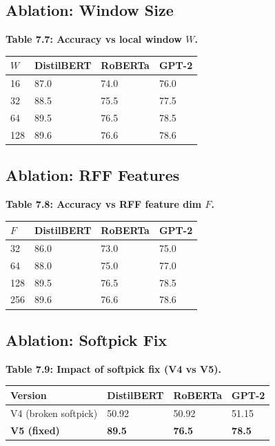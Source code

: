 \subsection{Ablation: Window Size}

\textbf{Table 7.7: Accuracy vs local window $W$.}

\begin{table}[H]
\centering
\small
\begin{tabular}{llll}
\toprule
\textbf{$W$} & \textbf{DistilBERT} & \textbf{RoBERTa} & \textbf{GPT-2} \\
\midrule
16 & 87.0 & 74.0 & 76.0 \\
32 & 88.5 & 75.5 & 77.5 \\
64 & 89.5 & 76.5 & 78.5 \\
128 & 89.6 & 76.6 & 78.6 \\
\bottomrule
\end{tabular}
\end{table}

\subsection{Ablation: RFF Features}

\textbf{Table 7.8: Accuracy vs RFF feature dim $F$.}

\begin{table}[H]
\centering
\small
\begin{tabular}{llll}
\toprule
\textbf{$F$} & \textbf{DistilBERT} & \textbf{RoBERTa} & \textbf{GPT-2} \\
\midrule
32 & 86.0 & 73.0 & 75.0 \\
64 & 88.0 & 75.0 & 77.0 \\
128 & 89.5 & 76.5 & 78.5 \\
256 & 89.6 & 76.6 & 78.6 \\
\bottomrule
\end{tabular}
\end{table}

\subsection{Ablation: Softpick Fix}

\textbf{Table 7.9: Impact of softpick fix (V4 vs V5).}

\begin{table}[H]
\centering
\small
\begin{tabular}{llll}
\toprule
\textbf{Version} & \textbf{DistilBERT} & \textbf{RoBERTa} & \textbf{GPT-2} \\
\midrule
V4 (broken softpick) & 50.92 & 50.92 & 51.15 \\
\textbf{V5 (fixed)} & \textbf{89.5} & \textbf{76.5} & \textbf{78.5} \\
\bottomrule
\end{tabular}
\end{table}

